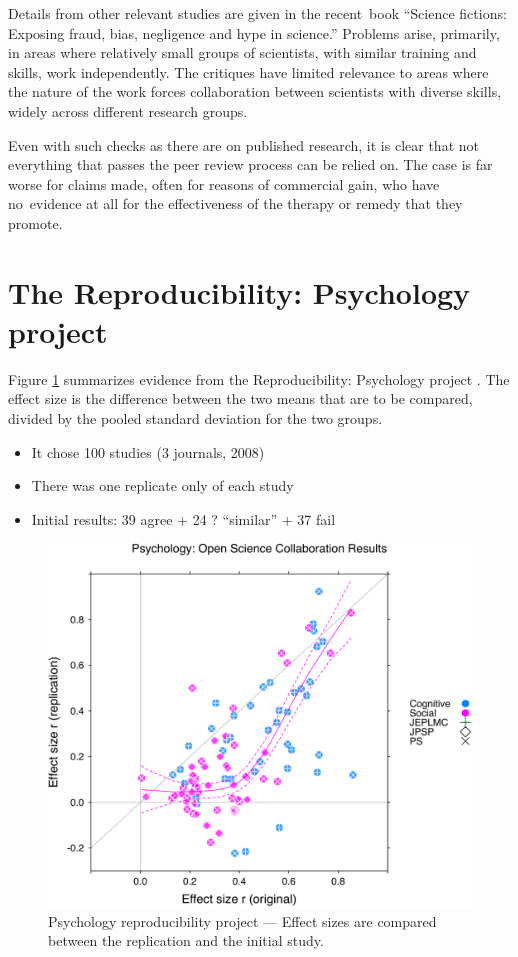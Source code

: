 \documentclass[
  10pt,
  b5paper]{book}
\providecommand{\tightlist}{%
  \setlength{\itemsep}{0pt}\setlength{\parskip}{0pt}}
\begin{document}
Details from other relevant studies are given in the
recent~book \citet{ritchie2020science} ``Science fictions: Exposing
fraud, bias, negligence and hype in science.''
Problems arise, primarily, in areas where relatively small
groups of scientists, with similar training and skills, work
independently. The critiques have limited relevance to
areas where the nature of the work forces collaboration
between scientists with diverse skills, widely across
different research groups.

Even with such checks as there are on published research, it is
clear that not everything that passes the peer review process
can be relied on. The case is far worse for claims made, often
for reasons of commercial gain, who have no~evidence at all for
the effectiveness of the therapy or remedy that they promote.

\hypertarget{the-reproducibility-psychology-project}{%
\section{The Reproducibility: Psychology project}\label{the-reproducibility-psychology-project}}

Figure \ref{fig:effect-size} summarizes evidence from
the Reproducibility: Psychology project \citep{r1_osc_EstRep2015}.
The effect size is the difference between the two means that
are to be compared, divided by the pooled standard deviation
for the two groups.

\begin{itemize}
\tightlist
\item
  It chose 100 studies (3 journals, 2008)
\item
  There was one replicate only of each study
\item
  Initial results: 39 agree + 24 ? ``similar'' + 37 fail
\end{itemize}

\begin{figure}[H]
\includegraphics[width=0.7\linewidth]{10-science_files/figure-latex/effect-size-1} \caption{Psychology reproducibility project --- Effect sizes are
compared between the replication and the initial study.}\label{fig:effect-size}
\end{figure}
\end{document}
